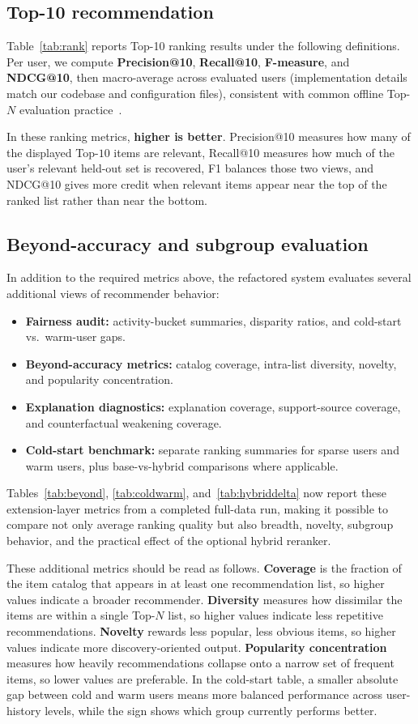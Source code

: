 \documentclass[sigconf,nonacm]{acmart}
\begin{document}
\subsection{Top-10 recommendation}
Table~\ref{tab:rank} reports Top-10 ranking results under the following definitions. Per user, we compute \textbf{Precision@10}, \textbf{Recall@10}, \textbf{F-measure}, and \textbf{NDCG@10}, then macro-average across evaluated users (implementation details match our codebase and configuration files), consistent with common offline Top-$N$ evaluation practice~\cite{herlocker2004evaluating,cremonesi2010}.

In these ranking metrics, \textbf{higher is better}. Precision@10 measures how many of the displayed Top-$10$ items are relevant, Recall@10 measures how much of the user's relevant held-out set is recovered, F1 balances those two views, and NDCG@10 gives more credit when relevant items appear near the top of the ranked list rather than near the bottom.

\subsection{Beyond-accuracy and subgroup evaluation}
In addition to the required metrics above, the refactored system evaluates several additional views of recommender behavior:
\begin{itemize}
  \item \textbf{Fairness audit:} activity-bucket summaries, disparity ratios, and cold-start vs.\ warm-user gaps.
  \item \textbf{Beyond-accuracy metrics:} catalog coverage, intra-list diversity, novelty, and popularity concentration.
  \item \textbf{Explanation diagnostics:} explanation coverage, support-source coverage, and counterfactual weakening coverage.
  \item \textbf{Cold-start benchmark:} separate ranking summaries for sparse users and warm users, plus base-vs-hybrid comparisons where applicable.
\end{itemize}
Tables~\ref{tab:beyond}, \ref{tab:coldwarm}, and~\ref{tab:hybriddelta} now report these extension-layer metrics from a completed full-data run, making it possible to compare not only average ranking quality but also breadth, novelty, subgroup behavior, and the practical effect of the optional hybrid reranker.

These additional metrics should be read as follows. \textbf{Coverage} is the fraction of the item catalog that appears in at least one recommendation list, so higher values indicate a broader recommender. \textbf{Diversity} measures how dissimilar the items are within a single Top-$N$ list, so higher values indicate less repetitive recommendations. \textbf{Novelty} rewards less popular, less obvious items, so higher values indicate more discovery-oriented output. \textbf{Popularity concentration} measures how heavily recommendations collapse onto a narrow set of frequent items, so lower values are preferable. In the cold-start table, a smaller absolute gap between cold and warm users means more balanced performance across user-history levels, while the sign shows which group currently performs better.
\end{document}
